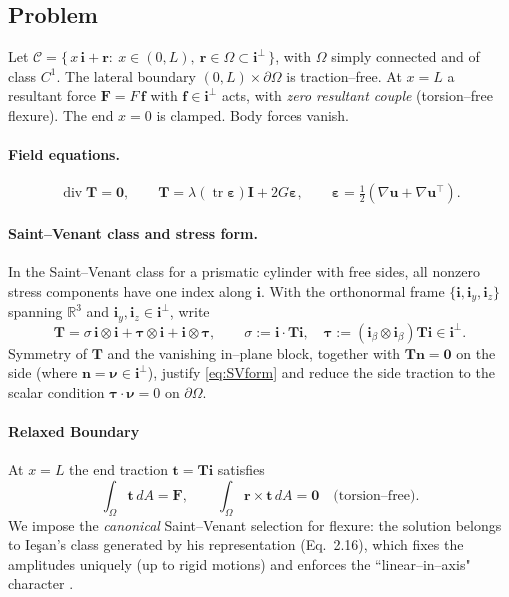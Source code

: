 \subsection*{Problem}

Let $\mathcal{C}=\{\,x\,\mathbf{i}+\bm{r}:\ x\in(0,L),\ \bm{r}\in\Omega\subset\mathbf{i}^\perp\,\}$, with $\Omega$ simply connected and of class $C^{1}$. The lateral boundary $(0,L)\times\partial\Omega$ is traction–free. At $x=L$ a resultant force $\bm{F}=F\,\bm{f}$ with $\bm{f}\in\mathbf{i}^\perp$ acts, with \emph{zero resultant couple} (torsion–free flexure). The end $x=0$ is clamped. Body forces vanish.

\paragraph{Field equations.}
\[
\operatorname{div}\bm{T}=\mathbf{0},\qquad
\bm{T}=\lambda(\operatorname{tr}\bm{\varepsilon})\mathbf{I}+2G\bm{\varepsilon},\qquad
\bm{\varepsilon}=\tfrac12(\nabla\bm{u}+\nabla\bm{u}^{\!\top}).
\]

\paragraph{Saint–Venant class and stress form.}
In the Saint–Venant class for a prismatic cylinder with free sides, all nonzero stress components have one index along $\mathbf{i}$. With the orthonormal frame $\{\mathbf{i},\mathbf{i}_y,\mathbf{i}_z\}$ spanning $\mathbb{R}^3$ and $\mathbf{i}_y,\mathbf{i}_z\in\mathbf{i}^\perp$, write
\begin{equation}
\bm{T}=\sigma\,\mathbf{i}\otimes\mathbf{i}+\bm{\tau}\otimes\mathbf{i}+\mathbf{i}\otimes\bm{\tau},
\qquad
\sigma:=\mathbf{i}\cdot\bm{T}\mathbf{i},\quad
\bm{\tau}:=(\mathbf{i}_\beta\otimes\mathbf{i}_\beta)\bm{T}\mathbf{i}\in\mathbf{i}^\perp.
\label{eq:SVform}
\end{equation}
Symmetry of $\bm{T}$ and the vanishing in–plane block, together with $\bm{T}\bm{n}=\mathbf{0}$ on the side (where $\bm{n}=\bm{\nu}\in\mathbf{i}^\perp$), justify \eqref{eq:SVform} and reduce the side traction to the scalar condition $\bm{\tau}\cdot\bm{\nu}=0$ on $\partial\Omega$.

\paragraph{Relaxed Boundary}
At $x=L$ the end traction $\bm{t}=\bm{T}\mathbf{i}$ satisfies
\[
\int_\Omega \bm{t}\,dA=\bm{F},\qquad
\int_\Omega \bm{r}\times\bm{t}\,dA=\mathbf{0}\quad\text{(torsion–free)}.
\]
We impose the \emph{canonical} Saint–Venant selection for flexure: the solution belongs to Ieşan’s class generated by his representation (Eq.\ 2.16), which fixes the amplitudes uniquely (up to rigid motions) and enforces the ``linear–in–axis" character \citep{iesan1987saintvenants}.

